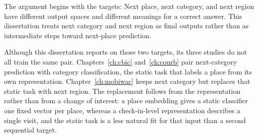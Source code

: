 The argument begins with the targets: Next place, next category, and next region have
different output spaces and different meanings for a correct answer. This dissertation
treats next category and next region as final outputs rather than as intermediate
steps toward next-place prediction.

Although this dissertation reports on those two targets, its three studies do not all
train the same pair. Chapters~\ref{ch:cbic}
and~\ref{ch:courb} pair next-category prediction with category classification, the
static task that labels a place from its own representation.
Chapter~\ref{ch:mobiwac} keeps next category but replaces that static task with next
region. The replacement follows from the representation rather than from a change of
interest: a place embedding gives a static classifier one fixed vector per place,
whereas a check-in-level representation describes a single visit, and the static task
is a less natural fit for that input than a second sequential target.

